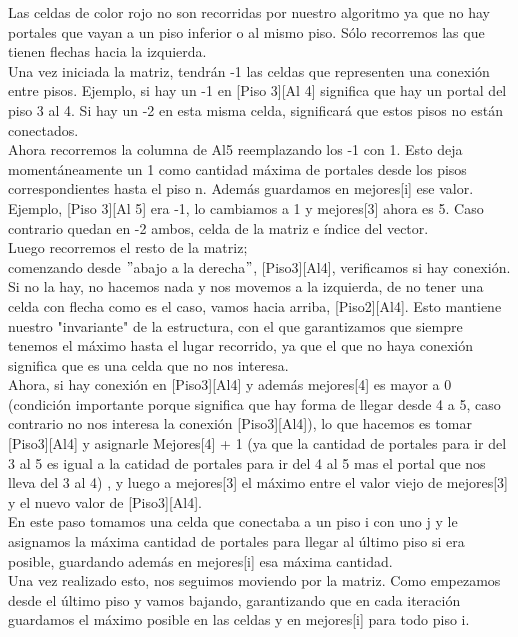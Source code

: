 Las celdas de color rojo no son recorridas por nuestro algoritmo ya que no hay portales que vayan a un piso inferior o al mismo piso. S\'olo recorremos las que tienen flechas hacia la izquierda.\\

Una vez iniciada la matriz, tendr\'an -1 las celdas que representen una conexi\'on entre pisos. Ejemplo, si hay un -1 en [Piso 3][Al 4] significa que hay un portal del piso 3 al 4. Si hay un -2 en esta misma celda, significar\'a que estos pisos no est\'an conectados.\\

Ahora recorremos la columna de Al5 reemplazando los -1 con 1. Esto deja moment\'aneamente un 1 como cantidad m\'axima de portales desde los pisos correspondientes hasta el piso n. Adem\'as guardamos en mejores[i] ese valor. Ejemplo, [Piso 3][Al 5] era -1, lo cambiamos a 1 y mejores[3] ahora es 5. Caso contrario quedan en -2 ambos, celda de la matriz e \'indice del vector. \\

Luego recorremos el resto de la matriz;\\comenzando desde $"$abajo a la derecha$"$, [Piso3][Al4], verificamos si hay conexi\'on. Si no la hay, no hacemos nada y nos movemos a la izquierda, de no tener una celda con flecha como es el caso, vamos hacia arriba, [Piso2][Al4]. Esto mantiene nuestro "invariante" de la estructura, con el que garantizamos que siempre tenemos el m\'aximo hasta el lugar recorrido, ya que el que no haya conexi\'on significa que es una celda que no nos interesa.\\

Ahora, si hay conexi\'on en [Piso3][Al4] y adem\'as mejores[4] es mayor a 0 (condici\'on importante porque significa que hay forma de llegar desde 4 a 5, caso contrario no nos interesa la conexi\'on [Piso3][Al4]), lo que hacemos es tomar [Piso3][Al4] y asignarle Mejores[4] + 1 (ya que la cantidad de portales para ir del 3 al 5 es igual a la catidad de portales para ir del 4 al 5 mas el portal que nos lleva del 3 al 4) , y luego a mejores[3] el m\'aximo entre el valor viejo de mejores[3] y el nuevo valor de [Piso3][Al4].\\

En este paso tomamos una celda que conectaba a un piso i con uno j y le asignamos la m\'axima cantidad de portales para llegar al \'ultimo piso si era posible, guardando adem\'as en mejores[i] esa m\'axima cantidad.\\
Una vez realizado esto, nos seguimos moviendo por la matriz.
Como empezamos desde el \'ultimo piso y vamos bajando, garantizando que en cada iteraci\'on guardamos el m\'aximo posible en las celdas y en mejores[i] para todo piso i.\\

